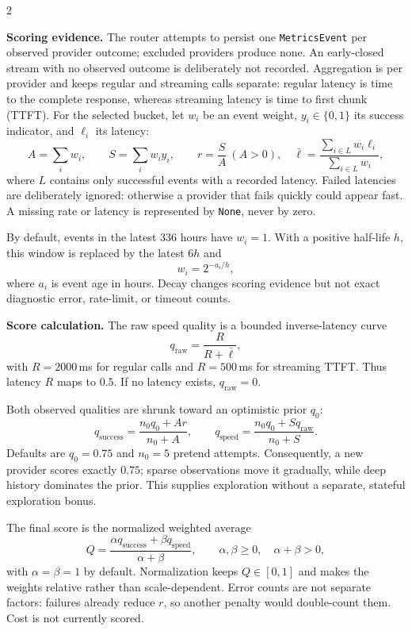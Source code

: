 \documentclass[10pt,a4paper]{article}
\newcommand{\code}[1]{\texttt{\small #1}}
\newcommand{\qualitysuccess}{q_{\mathrm{success}}}
\newcommand{\qualityspeed}{q_{\mathrm{speed}}}
\begin{document}
\begin{multicols}{2}
\small

\textbf{Scoring evidence.}
The router attempts to persist one \code{MetricsEvent} per observed provider
outcome; excluded providers produce none. An early-closed stream with no observed
outcome is deliberately not recorded. Aggregation is per provider and keeps
regular and streaming calls separate:
regular latency is time to the complete response, whereas streaming latency is
time to first chunk (TTFT). For the selected bucket, let $w_i$ be an event weight,
$y_i\in\{0,1\}$ its success indicator, and $\ell_i$ its latency:
\[
 A=\sum_i w_i,\qquad S=\sum_iw_i y_i,\qquad r=\frac{S}{A}\ (A>0),
\quad
\bar{\ell}=
\frac{\sum_{i\in L}w_i\ell_i}{\sum_{i\in L}w_i},
\]
where $L$ contains only successful events with a recorded latency. Failed
latencies are deliberately ignored: otherwise a provider that fails quickly
could appear fast. A missing rate or latency is represented by \code{None},
never by zero.

By default, events in the latest 336 hours have $w_i=1$. With a positive
half-life $h$, this window is replaced by the latest $6h$ and
\[
 w_i=2^{-a_i/h},
\]
where $a_i$ is event age in hours. Decay changes scoring evidence but not exact
diagnostic error, rate-limit, or timeout counts.

\textbf{Score calculation.}
The raw speed quality is a bounded inverse-latency curve
\[
 q_{\mathrm{raw}}=\frac{R}{R+\bar{\ell}},
\]
with $R=2000$\,ms for regular calls and $R=500$\,ms for streaming TTFT.
Thus latency $R$ maps to $0.5$. If no latency exists, $q_{\mathrm{raw}}=0$.

Both observed qualities are shrunk toward an optimistic prior $q_0$:
\[
 \qualitysuccess=\frac{n_0q_0+Ar}{n_0+A},
 \qquad
 \qualityspeed=\frac{n_0q_0+S q_{\mathrm{raw}}}{n_0+S}.
\]
Defaults are $q_0=0.75$ and $n_0=5$ pretend attempts. Consequently, a new
provider scores exactly $0.75$; sparse observations move it gradually, while
deep history dominates the prior. This supplies exploration without a separate,
stateful exploration bonus.

The final score is the normalized weighted average
\[
 Q=\frac{\alpha\qualitysuccess+\beta\qualityspeed}{\alpha+\beta},
\qquad \alpha,\beta\geq0,\quad \alpha+\beta>0,
\]
with $\alpha=\beta=1$ by default. Normalization keeps $Q\in[0,1]$ and makes the
weights relative rather than scale-dependent. Error counts are not separate
factors: failures already reduce $r$, so another penalty would double-count
them. Cost is not currently scored.


\end{multicols}
\end{document}
